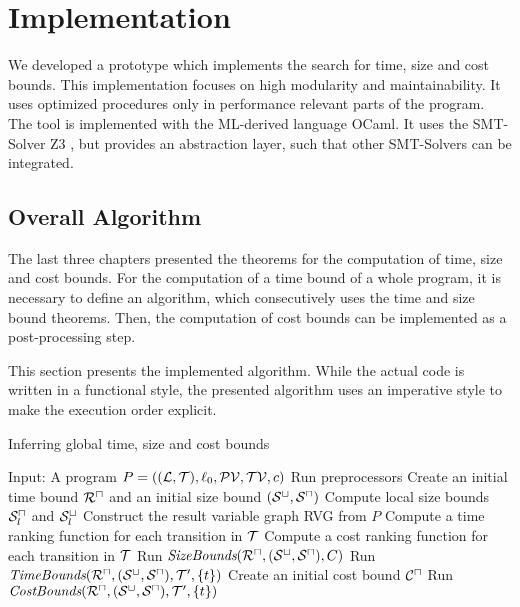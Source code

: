 \section{Implementation}

We developed a prototype which implements the search for time, size and cost bounds.
This implementation focuses on high modularity and maintainability.
It uses optimized procedures only in performance relevant parts of the program.
The tool is implemented with the ML-derived language OCaml.
It uses the SMT-Solver Z3 \cite{z3}, but provides an abstraction layer, such that other SMT-Solvers can be integrated.

\subsection{Overall Algorithm}

The last three chapters presented the theorems for the computation of time, size and cost bounds.
For the computation of a time bound of a whole program, it is necessary to define an algorithm, which consecutively uses the time and size bound theorems.
Then, the computation of cost bounds can be implemented as a post-processing step.

This section presents the implemented algorithm.
While the actual code is written in a functional style, the presented algorithm uses an imperative style to make the execution order explicit.

\begin{algorithm}
\caption{Inferring global time, size and cost bounds}\label{complete_algorithm}
\begin{algorithmic}[1]
  \State Input: A program $P = ((\mathcal{L}, \mathcal{T}),\ell_0,\mathcal{PV},\mathcal{TV},c)$
  \State Run preprocessors
  \State Create an initial time bound ${\mathcal{R}^\sqcap}$ and an initial size bound ${({\mathcal{S}^\sqcup}, {\mathcal{S}^\sqcap})}$
  \State Compute local size bounds ${\mathcal{S}^\sqcap_l}$ and ${\mathcal{S}^\sqcup_l}$
  \State Construct the result variable graph RVG from $P$
  \State Compute a time ranking function for each transition in $\mathcal{T}$
  \State Compute a cost ranking function for each transition in $\mathcal{T}$
  \Repeat
      \State Run $\emph{SizeBounds}({\mathcal{R}^\sqcap}, {({\mathcal{S}^\sqcup}, {\mathcal{S}^\sqcap})}, C)$
    \EndFor
        \State Run $\emph{TimeBounds}({\mathcal{R}^\sqcap}, {({\mathcal{S}^\sqcup}, {\mathcal{S}^\sqcap})}, \mathcal{T}', \lbrace t \rbrace)$
      \EndFor
    \EndFor
  \State Create an initial cost bound ${\mathcal{C}^\sqcap}$
    \State Run $\emph{CostBounds}({\mathcal{R}^\sqcap}, {({\mathcal{S}^\sqcup}, {\mathcal{S}^\sqcap})}, \mathcal{T}', \lbrace t \rbrace)$
  \EndFor
\end{algorithmic}
\end{algorithm}

